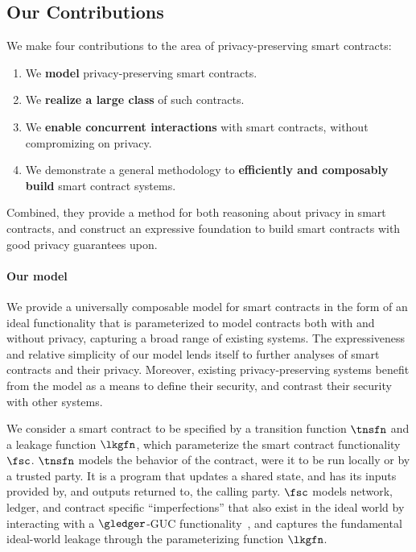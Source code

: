 \subsection{Our Contributions}

We make four contributions to the area of
privacy-preserving smart contracts:

\begin{enumerate}[label={\alph*)}]
  \item We \textbf{model} privacy-preserving smart contracts.
  \item We \textbf{realize a large class} of such contracts.
  \item We \textbf{enable concurrent interactions} with smart contracts,
    without compromizing on privacy.
  \item We demonstrate a general methodology to \textbf{efficiently and
      composably build} smart contract systems.
\end{enumerate}

Combined, they provide a method for both reasoning about
privacy in smart contracts, and construct an expressive foundation to build
smart contracts with good privacy guarantees upon.

\paragraph{Our model}
\sloppy
We provide a universally composable model for smart contracts in the form of an
ideal functionality that is parameterized to model contracts both with and
without privacy, capturing a broad range of existing systems. The
expressiveness and relative simplicity of our model lends itself to further
analyses of smart contracts and their privacy. Moreover, existing
privacy-preserving systems benefit from the model as a means to define their
security, and contrast their security with other systems.

\fussy
We consider a smart contract to be specified by a transition
function $\tnsfn$ and a leakage function $\lkgfn$, which parameterize the smart
contract functionality $\fsc$. $\tnsfn$ models the behavior of the contract,
were it to be run locally or by a trusted party. It is a program that updates a
shared state, and has its inputs provided by, and outputs returned to, the calling
party. $\fsc$ models network, ledger, and contract specific ``imperfections''
that also exist in the ideal world by interacting with a $\gledger$-GUC
functionality~\cite{TCC:CDPW07}, and captures the fundamental ideal-world
leakage through the parameterizing function $\lkgfn$.

